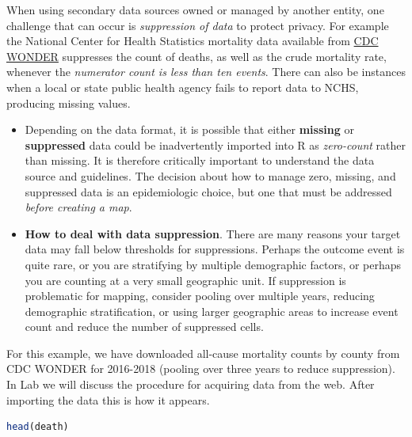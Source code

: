\documentclass[
]{book}
\newenvironment{rmdblock}[1]
  {%
  \begin{itemize}
  \renewcommand{\labelitemi}{
    \raisebox{-.7\height}[0pt][0pt]{
      {\setkeys{Gin}{width=3em,keepaspectratio}\texttt{[image: images/\#1]}}
    }
  }
  \item
  }
  {
  \end{itemize}
  }
\newenvironment{rmdtip}
  {\begin{rmdblock}{tip}}
  {\end{rmdblock}}
\newenvironment{rmdcaution}
  {\begin{rmdblock}{caution}}
  {\end{rmdblock}}
\begin{document}
When using secondary data sources owned or managed by another entity, one challenge that can occur is \emph{suppression of data} to protect privacy. For example the National Center for Health Statistics mortality data available from \href{https://wonder.cdc.gov/}{CDC WONDER} suppresses the count of deaths, as well as the crude mortality rate, whenever the \emph{numerator count is less than ten events}. There can also be instances when a local or state public health agency fails to report data to NCHS, producing missing values.

\begin{rmdcaution}
Depending on the data format, it is possible that either \textbf{missing} or \textbf{suppressed} data could be inadvertently imported into R as \emph{zero-count} rather than missing. It is therefore critically important to understand the data source and guidelines. The decision about how to manage zero, missing, and suppressed data is an epidemiologic choice, but one that must be addressed \emph{before creating a map}.\\
\end{rmdcaution}

\begin{rmdtip}
\textbf{How to deal with data suppression}. There are many reasons your target data may fall below thresholds for suppressions. Perhaps the outcome event is quite rare, or you are stratifying by multiple demographic factors, or perhaps you are counting at a very small geographic unit. If suppression is problematic for mapping, consider pooling over multiple years, reducing demographic stratification, or using larger geographic areas to increase event count and reduce the number of suppressed cells.
\end{rmdtip}

For this example, we have downloaded all-cause mortality counts by county from CDC WONDER for 2016-2018 (pooling over three years to reduce suppression). In Lab we will discuss the procedure for acquiring data from the web. After importing the data this is how it appears.

\begin{lstlisting}[language=R]
head(death)
\end{lstlisting}

 
  \providecommand{\huxb}[2]{\arrayrulecolor[RGB]{#1}\global\arrayrulewidth=#2pt}
  \providecommand{\huxvb}[2]{\color[RGB]{#1}\vrule width #2pt}
  \providecommand{\huxtpad}[1]{\rule{0pt}{#1}}
  \providecommand{\huxbpad}[1]{\rule[-#1]{0pt}{#1}}
\end{document}
